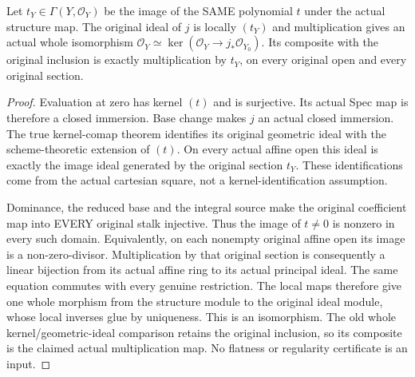 \begin{theorem}
\label{thm:projective-central-fibre-actual-parameter-ideal}
\leanok
Let $t_Y\in\Gamma(Y,\mathcal O_Y)$ be the image of the SAME polynomial
$t$ under the actual structure map. The original ideal of $j$ is locally
$(t_Y)$ and multiplication gives an actual whole isomorphism
$\mathcal O_Y\simeq\ker(\mathcal O_Y\to j_*\mathcal O_{Y_0})$.
Its composite with the original inclusion is exactly multiplication by
$t_Y$, on every original open and every original section.
\end{theorem}
\begin{proof}
Evaluation at zero has kernel $(t)$ and is surjective. Its actual Spec
map is therefore a closed immersion. Base change makes $j$ an actual
closed immersion. The true kernel-comap theorem identifies its original
geometric ideal with the scheme-theoretic extension of $(t)$. On every
actual affine open this ideal is exactly the image ideal generated by
the original section $t_Y$. These identifications come from the actual
cartesian square, not a kernel-identification assumption.

Dominance, the reduced base and the integral source make the original
coefficient map into EVERY original stalk injective. Thus the image of
$t\ne0$ is nonzero in every such domain. Equivalently, on each nonempty
original affine open its image is a non-zero-divisor. Multiplication
by that original section is consequently a linear bijection from its
actual affine ring to its actual principal ideal. The same equation
commutes with every genuine restriction. The local maps therefore give
one whole morphism from the structure module to the original ideal
module, whose local inverses glue by uniqueness. This is an isomorphism.
The old whole kernel/geometric-ideal comparison retains the original
inclusion, so its composite is the claimed actual multiplication map.
No flatness or regularity certificate is an input.
\end{proof}

